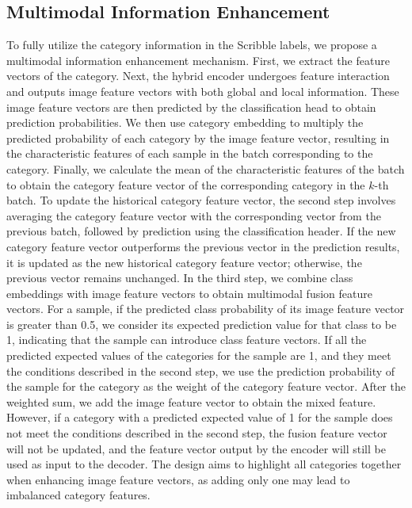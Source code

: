\documentclass[sigconf,natbib=false]{acmart}
\begin{document}
\subsection{Multimodal Information Enhancement}
To fully utilize the category information in the Scribble labels, we propose a multimodal information enhancement mechanism. First, we extract the feature vectors of the category. Next, the hybrid encoder undergoes feature interaction and outputs image feature vectors with both global and local information. These image feature vectors are then predicted by the classification head to obtain prediction probabilities. We then use category embedding to multiply the predicted probability of each category by the image feature vector, resulting in the characteristic features of each sample in the batch corresponding to the category. Finally, we calculate the mean of the characteristic features of the batch to obtain the category feature vector of the corresponding category in the $k$-th batch.
To update the historical category feature vector, the second step involves averaging the category feature vector with the corresponding vector from the previous batch, followed by prediction using the classification header. If the new category feature vector outperforms the previous vector in the prediction results, it is updated as the new historical category feature vector; otherwise, the previous vector remains unchanged.
In the third step, we combine class embeddings with image feature vectors to obtain multimodal fusion feature vectors. For a sample, if the predicted class probability of its image feature vector is greater than 0.5, we consider its expected prediction value for that class to be 1, indicating that the sample can introduce class feature vectors. If all the predicted expected values of the categories for the sample are 1, and they meet the conditions described in the second step, we use the prediction probability of the sample for the category as the weight of the category feature vector. After the weighted sum, we add the image feature vector to obtain the mixed feature. However, if a category with a predicted expected value of 1 for the sample does not meet the conditions described in the second step, the fusion feature vector will not be updated, and the feature vector output by the encoder will still be used as input to the decoder. The design aims to highlight all categories together when enhancing image feature vectors, as adding only one may lead to imbalanced category features.
\end{document}
